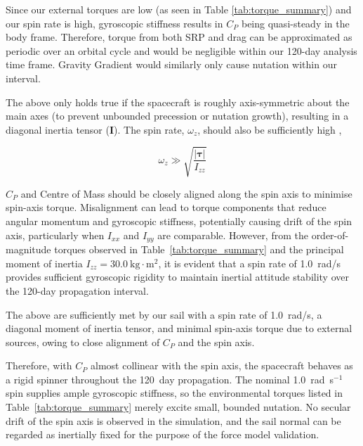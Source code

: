 \documentclass[final,3p,times,twocolumn]{elsarticle}
\begin{document}
\vspace{5pt}
\par\noindent
Since our external torques are low (as seen in Table \ref{tab:torque_summary}) and our spin rate is high, gyroscopic stiffness results in \( C_P \) being quasi-steady in the body frame. Therefore, torque from both SRP and drag can be approximated as periodic over an orbital cycle and would be negligible within our 120-day analysis time frame. Gravity Gradient would similarly only cause nutation within our interval.

\vspace{5pt}
\par\noindent
The above only holds true if the spacecraft is roughly axis-symmetric about the main axes (to prevent unbounded precession or nutation growth), resulting in a diagonal inertia tensor (\( \mathbf{I} \)).
The spin rate, \( \omega_z \), should also be sufficiently high \citep{SpinRate},


\begin{equation}
\omega_z \gg \sqrt{\frac{|\boldsymbol{\tau}|}{I_{zz}}}
\label{eq:SpinRate}
\end{equation}

\par\noindent \par\noindent \(C_P\) and Centre of Mass should be closely aligned along the spin axis to minimise spin-axis torque. Misalignment can lead to torque components that reduce angular momentum and gyroscopic stiffness, potentially causing drift of the spin axis, particularly when \(I_{xx}\) and \(I_{yy}\) are comparable. However, from the order-of-magnitude torques observed in Table~\ref{tab:torque_summary} and the principal moment of inertia \(I_{zz} = 30.0~\text{kg}\cdot\text{m}^2\), it is evident that a spin rate of 1.0~rad/s provides sufficient gyroscopic rigidity to maintain inertial attitude stability over the 120-day propagation interval.



\vspace{5pt}
\par\noindent The above are sufficiently met by our sail with a spin rate of 1.0~rad/s, a diagonal moment of inertia tensor, and minimal spin-axis torque due to external sources, owing to close alignment of \(C_P\) and the spin axis.

\vspace{5pt}
\par\noindent Therefore, with \(C_P\) almost collinear with the spin axis, the spacecraft behaves as a rigid spinner throughout the 120~day propagation. The nominal 1.0~rad~s$^{-1}$ spin supplies ample gyroscopic stiffness, so the environmental torques listed in Table~\ref{tab:torque_summary} merely excite small, bounded nutation. No secular drift of the spin axis is observed in the simulation, and the sail normal can be regarded as inertially fixed for the purpose of the force model validation.
\end{document}
